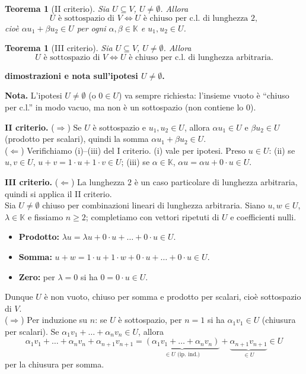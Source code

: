 \documentclass[11pt,a4paper]{article}
\newcommand{\KK}{\mathbb{K}}
\theoremstyle{plain}
\newtheorem{teo}[prop]{Teorema}
\theoremstyle{definition}
\theoremstyle{remark}
\begin{document}
\begin{teo}[II criterio]\label{teo:II}
Sia $U\subseteq V$, $U\neq\emptyset$. Allora
\[
  U\text{ è sottospazio di }V\iff U\text{ è chiuso per c.l. di lunghezza }2,
\]
cioè $\alpha u_1+\beta u_2\in U$ per ogni $\alpha,\beta\in\KK$ e $u_1,u_2\in U$.
\end{teo}

\begin{teo}[III criterio]\label{teo:III}
Sia $U\subseteq V$, $U\neq\emptyset$. Allora
\[
  U\text{ è sottospazio di }V\iff U\text{ è chiuso per c.l. di lunghezza arbitraria.}
\]
\end{teo}

\par\medskip
\noindent\textbf{dimostrazioni e nota sull'ipotesi $U\ne\emptyset$.}\par

\textbf{Nota.} L'ipotesi $U\ne\emptyset$ (o $0\in U$) va sempre richiesta: l'insieme vuoto è ``chiuso per c.l.'' in modo vacuo, ma non è un sottospazio (non contiene lo $0$).

\smallskip
\textbf{II criterio.}
($\Rightarrow$) Se $U$ è sottospazio e $u_1,u_2\in U$, allora $\alpha u_1\in U$ e $\beta u_2\in U$ (prodotto per scalari), quindi la somma $\alpha u_1+\beta u_2\in U$.\\
($\Leftarrow$) Verifichiamo (i)--(iii) del I criterio. (i) vale per ipotesi. Preso $u\in U$:
(ii) se $u,v\in U$, $u+v=1\cdot u+1\cdot v\in U$; (iii) se $\alpha\in\KK$, $\alpha u=\alpha u+0\cdot u\in U$.

\smallskip
\textbf{III criterio.}
($\Leftarrow$) La lunghezza $2$ è un caso particolare di lunghezza arbitraria, quindi si applica il II criterio.\\
Sia $U\neq\emptyset$ chiuso per combinazioni lineari di lunghezza arbitraria.
Siano $u,w\in U$, $\lambda\in\KK$ e fissiamo $n\ge 2$; completiamo con vettori ripetuti di $U$ e coefficienti nulli.

\begin{itemize}
  \item \textbf{Prodotto:} $\lambda u = \lambda u + 0\cdot u + \dots + 0\cdot u \in U$.
  \item \textbf{Somma:} $u+w = 1\cdot u + 1\cdot w + 0\cdot u + \dots + 0\cdot u \in U$.
  \item \textbf{Zero:} per $\lambda=0$ si ha $0=0\cdot u\in U$.
\end{itemize}

Dunque $U$ è non vuoto, chiuso per somma e prodotto per scalari, cioè sottospazio di $V$.\\
($\Rightarrow$) Per induzione su $n$: se $U$ è sottospazio, per $n=1$ si ha $\alpha_1v_1\in U$ (chiusura per scalari).
Se $\alpha_1v_1+\dots+\alpha_nv_n\in U$, allora
\[
  \alpha_1v_1+\dots+\alpha_nv_n+\alpha_{n+1}v_{n+1}=\underbrace{(\alpha_1v_1+\dots+\alpha_nv_n)}_{\in U\text{ (ip.\ ind.)}}+\underbrace{\alpha_{n+1}v_{n+1}}_{\in U}\in U
\]
per la chiusura per somma.
\par\medskip
\end{document}
